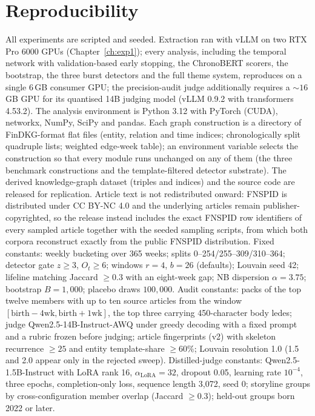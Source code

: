 \documentclass[a4paper,12pt]{report}
\begin{document}
\chapter{Reproducibility}
All experiments are scripted and seeded. Extraction ran with vLLM on two RTX
Pro 6000 GPUs (Chapter~\ref{ch:exp1}); every analysis, including the temporal
network with validation-based early stopping, the ChronoBERT scorers, the
bootstrap, the three burst detectors and the full theme system, reproduces on
a single 6\,GB consumer GPU; the precision-audit judge additionally requires
a ${\sim}16$\,GB GPU for its quantised 14B judging model (vLLM 0.9.2 with
transformers 4.53.2). The analysis environment is Python 3.12 with
PyTorch (CUDA), networkx, NumPy, SciPy and pandas. Each graph construction is
a directory of FinDKG-format flat files (entity, relation and time indices;
chronologically split quadruple lists; weighted edge-week table); an
environment variable selects the construction so that every module runs
unchanged on any of them (the three benchmark constructions and the
template-filtered detector substrate). The derived knowledge-graph dataset (triples
and indices) and the source code are released for replication. Article text
is not redistributed onward: FNSPID is distributed under CC BY-NC 4.0 and the
underlying articles remain publisher-copyrighted, so the release instead
includes the exact FNSPID row identifiers of every sampled article together
with the seeded sampling scripts, from which both corpora reconstruct
exactly from the public FNSPID distribution. Fixed constants: weekly bucketing over 365 weeks; splits
0--254/255--309/310--364; detector gate $z \geq 3$, $O_t \geq 6$; windows
$r=4$, $b=26$ (defaults); Louvain seed 42; lifeline matching Jaccard
$\geq 0.3$ with an eight-week gap; NB dispersion $\alpha = 3.75$; bootstrap
$B = 1{,}000$; placebo draws $100{,}000$. Audit constants: packs of the top
twelve members with up to ten source articles from the window
$[\text{birth}-4\text{wk}, \text{birth}+1\text{wk}]$, the top three carrying
450-character body ledes; judge Qwen2.5-14B-Instruct-AWQ under greedy
decoding with a fixed prompt and a rubric frozen before judging; article
fingerprints (v2) with skeleton recurrence $\geq 25$ and entity
template-share $\geq 60\%$; Louvain resolution 1.0 (1.5 and 2.0 appear only
in the rejected sweep). Distilled-judge constants:
Qwen2.5-1.5B-Instruct with LoRA rank 16, $\alpha_{\text{LoRA}} = 32$,
dropout 0.05, learning rate $10^{-4}$, three epochs, completion-only
loss, sequence length 3{,}072, seed 0; storyline groups by
cross-configuration member overlap (Jaccard $\geq 0.3$); held-out
groups born 2022 or later.
\end{document}
